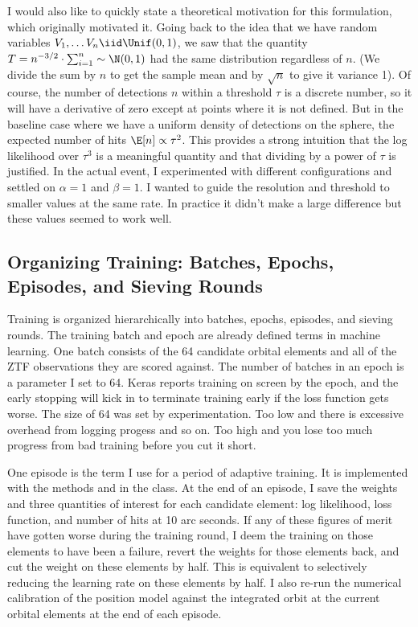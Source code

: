 I would also like to quickly state a theoretical motivation for this formulation, which originally motivated it.
Going back to the idea that we have random variables $V_1, \ldots V_n \iid \Unif(0, 1)$,
we saw that the quantity $T = n^{-3/2} \cdot \sum_{i=1}^{n} \sim \N(0,1)$ had the same distribution regardless of $n$.
(We divide the sum by $n$ to get the sample mean and by $\sqrt{n}$ to give it variance 1).
Of course, the number of detections $n$ within a threshold $\tau$ is a discrete number, 
so it will have a derivative of zero except at points where it is not defined.
But in the baseline case where we have a uniform density of detections on the sphere,
the expected number of hits $\E[n] \propto \tau^2$.
This provides a strong intuition that the log likelihood over $\tau^3$ is a meaningful quantity
and that dividing by a power of $\tau$ is justified.
In the actual event, I experimented with different configurations and settled on $\alpha=1$ and $\beta=1$.
I wanted to guide the resolution and threshold to smaller values at the same rate.
In practice it didn't make a large difference but these values seemed to work well.

\subsection{Organizing Training: Batches, Epochs, Episodes, and Sieving Rounds}
Training is organized hierarchically into batches, epochs, episodes, and sieving rounds.
The training batch and epoch are already defined terms in machine learning.
One batch consists of the 64 candidate orbital elements and all of the ZTF observations they are scored against.
The number of batches in an epoch is a parameter I set to 64.
Keras reports training on screen by the epoch, 
and the early stopping will kick in to terminate training early if the loss function gets worse.
The size of 64 was set by experimentation.
Too low and there is excessive overhead from logging progess and so on.
Too high and you lose too much progress from bad training before you cut it short.

One episode is the term I use for a period of adaptive training.
It is implemented with the methods  and  in the  class.
At the end of an episode, I save the weights and three quantities of interest for each candidate element:
log likelihood, loss function, and number of hits at 10 arc seconds.
If any of these figures of merit have gotten worse during the training round,
I deem the training on those elements to have been a failure, revert the weights for those elements back, and cut the weight on these elements by half.
This is equivalent to selectively reducing the learning rate on these elements by half.
I also re-run the numerical calibration of the position model against the  integrated orbit at the current orbital elements at the end of each episode.

